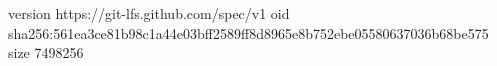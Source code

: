 version https://git-lfs.github.com/spec/v1
oid sha256:561ea3ce81b98c1a44e03bff2589ff8d8965e8b752ebe05580637036b68be575
size 7498256
